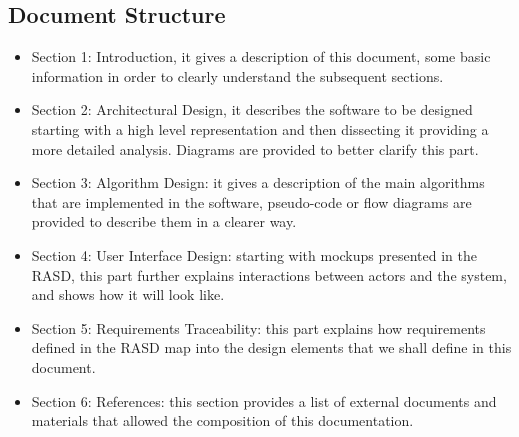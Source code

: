 \subsection{Document Structure}
\begin{itemize}
	\item Section 1: Introduction, it gives a description of this document, some basic information in order to clearly understand the subsequent sections.
	\item Section 2: Architectural Design, it describes the software to be designed starting with a high level representation and then dissecting it providing a more detailed analysis. Diagrams are provided to better clarify this part.
	\item Section 3: Algorithm Design: it gives a description of the main algorithms that are implemented in the software, pseudo-code or flow diagrams are provided to describe them in a clearer way.
	\item Section 4: User Interface Design: starting with mockups presented in the RASD, this part further explains interactions between actors and the system, and shows how it will look like.
	\item Section 5: Requirements Traceability: this part explains how requirements defined in the RASD map into the design elements that we shall define in this document.
	\item Section 6: References: this section provides a list of external documents and materials that allowed the composition of this documentation.
\end{itemize}